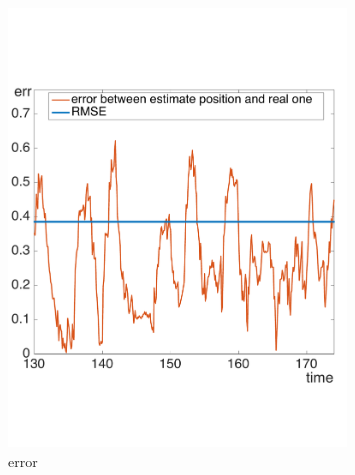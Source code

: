 \begin{figure}[!ht]
    \centering
    \includegraphics[width=0.8\textwidth]{img/high_altitude_error.pdf}
      \caption{error}
    \label{fig:ekf_high_altitude_error}
\end{figure}

